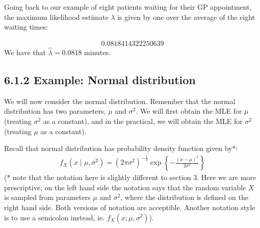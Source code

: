 \documentclass[letterpaper,10pt,english]{jupyterBook}
\begin{document}
\sphinxAtStartPar
Going back to our example of eight patients waiting for their GP appointment, the maximum likelihood estimate \(\lambda\) is given by one over the average of the eight waiting times:

\begin{sphinxVerbatim}[commandchars=\\\{\}]
\end{sphinxVerbatim}
\begin{equation*}
\begin{split}0.0818414322250639\end{split}
\end{equation*}
\sphinxAtStartPar
We have that \(\hat{\lambda}=0.0818\) minutes.


\subsection{6.1.2 Example: Normal distribution}
\label{\detokenize{06.b. Maximum Likelihood:example-normal-distribution}}
\sphinxAtStartPar
We will now consider the normal distribution. Remember that the normal distribution has two parameters, \(\mu\) and \(\sigma^2\). We will first obtain the MLE for \(\mu\) (treating \(\sigma^2\) as a constant), and in the practical, we will obtain the MLE for \(\sigma^2\) (treating \(\mu\) as a constant).

\sphinxAtStartPar
Recall that normal distribution has probability density function given by*:
\begin{equation*}
\begin{split}
\begin{equation}  
f_X \left( x \mid \mu, \sigma^2 \right)= (2 \pi \sigma^2)^{-\frac{1}{2}} \exp \left\{-\frac{(x-\mu)^2}{2\sigma^2} \right\}
\end{equation}
\end{split}
\end{equation*}
\sphinxAtStartPar
(* note that the notation here is slightly different to section 3. Here we are more prescriptive; on the left hand side the notation says that the random variable \(X\) is sampled from parameters \(\mu\) and \(\sigma^2\), where the distribution is defined on the right hand side. Both versions of notation are acceptible. Another notation style is to use a semi\sphinxhyphen{}colon instead, ie. \(f_X( x ; \mu, \sigma^2)\)).
\end{document}
